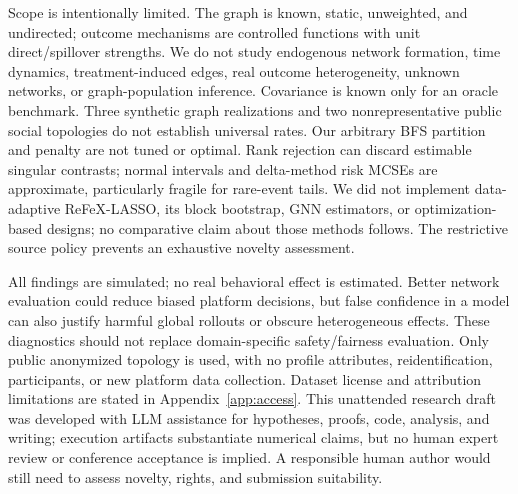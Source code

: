 \documentclass{article}
\begin{document}
Scope is intentionally limited. The graph is known, static, unweighted, and undirected; outcome mechanisms are controlled functions with unit direct/spillover strengths. We do not study endogenous network formation, time dynamics, treatment-induced edges, real outcome heterogeneity, unknown networks, or graph-population inference. Covariance is known only for an oracle benchmark. Three synthetic graph realizations and two nonrepresentative public social topologies do not establish universal rates. Our arbitrary BFS partition and penalty are not tuned or optimal. Rank rejection can discard estimable singular contrasts; normal intervals and delta-method risk MCSEs are approximate, particularly fragile for rare-event tails. We did not implement data-adaptive ReFeX-LASSO, its block bootstrap, GNN estimators, or optimization-based designs; no comparative claim about those methods follows. The restrictive source policy prevents an exhaustive novelty assessment.

All findings are simulated; no real behavioral effect is estimated. Better network evaluation could reduce biased platform decisions, but false confidence in a model can also justify harmful global rollouts or obscure heterogeneous effects. These diagnostics should not replace domain-specific safety/fairness evaluation. Only public anonymized topology is used, with no profile attributes, reidentification, participants, or new platform data collection. Dataset license and attribution limitations are stated in Appendix~\ref{app:access}. This unattended research draft was developed with LLM assistance for hypotheses, proofs, code, analysis, and writing; execution artifacts substantiate numerical claims, but no human expert review or conference acceptance is implied. A responsible human author would still need to assess novelty, rights, and submission suitability.
\end{document}
